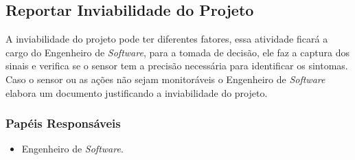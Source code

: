 %
%

\subsection{Reportar Inviabilidade do Projeto}
A inviabilidade do projeto pode ter diferentes fatores, essa atividade ficará a cargo do Engenheiro de \textit{Software}, para a tomada de decisão, ele faz a captura dos sinais e verifica se o sensor tem a precisão necessária para identificar os sintomas. Caso o sensor ou as ações não sejam monitoráveis o Engenheiro de \textit{Software} elabora um documento justificando a inviabilidade do projeto.

\subsubsection{Papéis Responsáveis}
\begin{itemize}
	\item Engenheiro de \textit{Software}.
\end{itemize}

